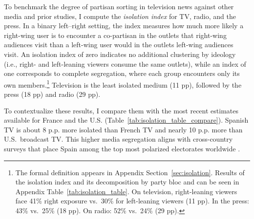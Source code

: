 \documentclass[12pt]{article}
\begin{document}
	
	
	
	
	To benchmark the degree of partisan sorting in television news against other media and prior studies, I compute the \emph{isolation index} \citep{gentzkow_isolation} for TV, radio, and the press. In a binary left–right setting, the index measures how much more likely a right-wing user is to encounter a co-partisan in the outlets that right-wing audiences visit than a left-wing user would in the outlets left-wing audiences visit. An isolation index of zero indicates no additional clustering by ideology (i.e., right- and left-leaning viewers consume the same outlets), while an index of one corresponds to complete segregation, where each group encounters only its own members.\footnote{The formal definition appears in Appendix  Section~\ref{sec:isolation}. Results of the isolation index and its decomposition by party bloc and can be seen in  Appendix Table~\ref{tab:isolation_table}. On television, right-leaning viewers face 41\% right exposure vs.\ 30\% for left-leaning viewers (11 pp). In the press: 43\% vs.\ 25\% (18 pp). On radio: 52\% vs.\ 24\% (29 pp).} Television is the least isolated medium (11 pp), followed by the press (18 pp) and radio (29 pp).
	

	
	
To contextualize these results, I compare them with the most recent estimates available for France  \citep{Dejean2022PartisanSE} and the U.S. \citep{gentzkow_isolation} (Table~\ref{tab:isolation_table_compare}). Spanish TV is about 8 p.p. more isolated than French TV and nearly 10 p.p. more than U.S.\ broadcast TV. This higher media segregation aligns with cross-country surveys that place Spain among the top most polarized electorates worldwide \citep{edelman_trust_2023}.
	
	
	
	
	
	
\end{document}
